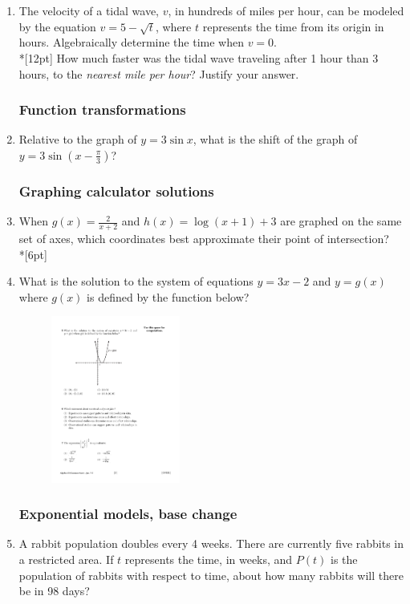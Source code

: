 \documentclass[12pt, oneside]{article}
\begin{document}
\begin{enumerate}
\item The velocity of a tidal wave, $v$, in hundreds of miles per hour, can be modeled by the equation $v= 5-\sqrt{t}$, where $t$ represents the time from its origin in hours. Algebraically determine the time when $v=0$.\\*[12pt]
How much faster was the tidal wave traveling after 1 hour than 3 hours, to the \textit{nearest mile per hour}? Justify your answer.


\subsubsection*{Function transformations}
\item Relative to the graph of $y=3 \sin x$, what is the shift of the graph of $y=3 \sin {\left(x- \frac{\pi}{3}\right)}$?

\subsubsection*{Graphing calculator solutions}
\item When $\displaystyle g(x)=\frac{2}{x+2}$ and $h(x)= \log (x+1)+3$ are graphed on the same set of axes, which coordinates best approximate their point of intersection?\\*[6pt]

\item What is the solution to the system of equations $y=3x-2$ and $y=g(x)$ where $g(x)$ is defined by the function below?

\begin{figure}[!ht]
    \centering
    \includegraphics[width=0.4\textwidth]{parabola-graphic.pdf}
\end{figure}


\subsubsection*{Exponential models, base change}
\item A rabbit population doubles every 4 weeks. There are currently five rabbits in a restricted area. If $t$ represents the time, in weeks, and $P(t)$ is the population of rabbits with respect to time, about how many rabbits will there be in 98 days?


\end{enumerate}
\end{document}
